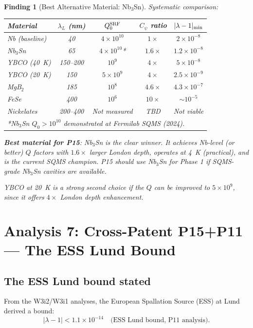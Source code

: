 \documentclass[11pt]{article}
\newtheorem{finding}{Finding}
\newcommand{\ee}[1]{\times 10^{#1}}
\newcommand{\lam}{\lambda}
\begin{document}
\begin{finding}[Best Alternative Material: Nb$_3$Sn]
\label{find:best-material}
Systematic comparison:
\begin{center}
\begin{tabular}{lcccc}
\toprule
Material & $\lambda_L$ (nm) & $Q_0^{\rm SRF}$ & $C_\psi$ ratio & $|\lam-1|_{\rm min}$ \\
\midrule
Nb (baseline) & 40 & $4\ee{10}$ & $1\times$ & $2\ee{-8}$ \\
Nb$_3$Sn & 65 & $4\ee{10}$* & $1.6\times$ & $1.2\ee{-8}$ \\
YBCO (40~K) & 150--200 & $10^9$ & $4\times$ & $5\ee{-8}$ \\
YBCO (20~K) & 150 & $5\ee{9}$ & $4\times$ & $2.5\ee{-9}$ \\
MgB$_2$ & 185 & $10^8$ & $4.6\times$ & $4.3\ee{-7}$ \\
FeSe & 400 & $10^6$ & $10\times$ & $\sim 10^{-5}$ \\
Nickelates & 200--400 & Not measured & TBD & Not viable \\
\bottomrule
\multicolumn{5}{l}{*Nb$_3$Sn $Q_0 > 10^{10}$ demonstrated at Fermilab SQMS (2024).}
\end{tabular}
\end{center}

\textbf{Best material for P15}: Nb$_3$Sn is the clear winner. It achieves
Nb-level (or better) $Q$ factors with $1.6\times$ larger London depth, operates
at 4~K (practical), and is the current SQMS champion. P15 should use
Nb$_3$Sn for Phase 1 if SQMS-grade Nb$_3$Sn cavities are available.

YBCO at 20~K is a strong second choice if the $Q$ can be improved to $5\ee{9}$,
since it offers $4\times$ London depth enhancement.
\end{finding}

\section{Analysis 7: Cross-Patent P15+P11 --- The ESS Lund Bound}
\label{sec:p11-bound}

\subsection{The ESS Lund bound stated}

From the W3i2/W3i1 analyses, the European Spallation Source (ESS) at Lund
derived a bound:
\begin{equation}
|\lam-1| < 1.1\ee{-14} \quad \text{(ESS Lund bound, P11 analysis)}.
\end{equation}
\end{document}
